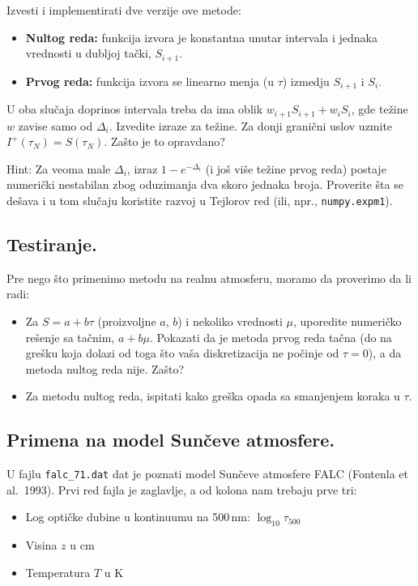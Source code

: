 \documentclass[12pt]{article}
\begin{document}
Izvesti i implementirati dve verzije ove metode:
\begin{itemize}
    \item \textbf{Nultog reda:} funkcija izvora je konstantna unutar intervala i jednaka vrednosti u dubljoj ta\v{c}ki, $S_{i+1}$.
    \item \textbf{Prvog reda:} funkcija izvora se linearno menja (u $\tau$) izmedju $S_{i+1}$ i $S_i$.
\end{itemize}

U oba slu\v{c}aja doprinos intervala treba da ima oblik $w_{i+1} S_{i+1} + w_i S_i$, gde te\v{z}ine $w$ zavise samo od $\Delta_i$. Izvedite izraze za te\v{z}ine. Za donji grani\v{c}ni uslov uzmite $I^+(\tau_N) = S(\tau_N)$. Za\v{s}to je to opravdano?

Hint: Za veoma male $\Delta_i$, izraz $1-e^{-\Delta_i}$ (i jo\v{s} vi\v{s}e te\v{z}ine prvog reda) postaje numeri\v{c}ki nestabilan zbog oduzimanja dva skoro jednaka broja. Proverite \v{s}ta se de\v{s}ava i u tom slu\v{c}aju koristite razvoj u Tejlorov red (ili, npr., \texttt{numpy.expm1}).

\subsection*{Testiranje.} 
Pre nego \v{s}to primenimo metodu na realnu atmosferu, moramo da proverimo da li radi:

\begin{itemize}
    \item Za $S = a + b\tau$ (proizvoljne $a$, $b$) i nekoliko vrednosti $\mu$, uporedite numeri\v{c}ko re\v{s}enje sa ta\v{c}nim, $a+b\mu$. Pokazati da je metoda prvog reda ta\v{c}na (do na gre\v{s}ku koja dolazi od toga \v{s}to va\v{s}a diskretizacija ne po\v{c}inje od $\tau=0$), a da metoda nultog reda nije. Za\v{s}to?
        
    \item Za metodu nultog reda, ispitati kako gre\v{s}ka opada sa smanjenjem koraka u $\tau$.
\end{itemize}

\subsection*{Primena na model Sun\v{c}eve atmosfere.} 

U fajlu \texttt{falc\_71.dat} dat je poznati model Sun\v{c}eve atmosfere FALC (Fontenla et al.\ 1993). Prvi red fajla je zaglavlje, a od kolona nam trebaju prve tri:
\begin{itemize}
    \item[0:] Log opti\v{c}ke dubine u kontinuumu na 500\,nm: $\log_{10} \tau_{500}$
    \item[1:] Visina $z$ u cm
    \item[2:] Temperatura $T$ u K
\end{itemize}
\end{document}
